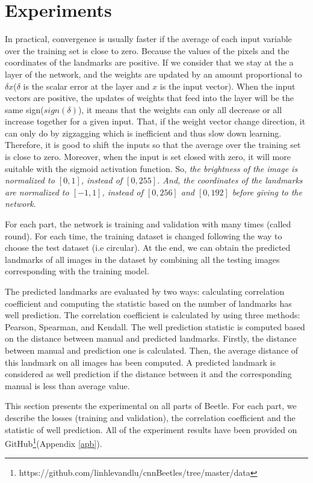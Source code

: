 \documentclass[12pt,a4paper]{article}
\begin{document}
\section{Experiments}
In practical, convergence is usually faster if the average of each input variable over the training set is close to zero. Because the values of the pixels and the coordinates of the landmarks are positive. If we consider that we stay at the a layer of the network, and the weights are updated by an amount proportional to $\delta x$($\delta$ is the scalar error at the layer and $x$ is the input vector). When the input vectors are positive, the updates of weights that feed into the layer will be the same sign($sign(\delta)$), it means that the weights can only all decrease or all increase together for a given input. That, if the weight vector change direction, it can only do by zigzagging which is inefficient and thus slow down learning. Therefore, it is good to shift the inputs so that the average over the training set is close to zero. Moreover, when the input is set closed with zero, it will more suitable with the sigmoid activation function\cite{lecun2012efficient}. So, \textit{the brightness of the image is normalized to $[0,1]$, instead of $[0,255]$. And, the coordinates of the landmarks are normalized to $[-1,1]$, instead of $[0,256]$ and $[0,192]$ before giving to the network}.

For each part, the network is training and validation with many times (called round). For each time, the training dataset is changed following the way to choose the test dataset (i.e circular). At the end, we can obtain the predicted landmarks of all images in the dataset by combining all the  testing images corresponding with the training model. 

The predicted landmarks are evaluated by two ways: calculating correlation coefficient and computing the statistic based on the number of landmarks has well prediction.
The correlation coefficient is calculated by using three methods: Pearson\cite{pallant2013spss}, Spearman\cite{myers2010research}, and Kendall\cite{kendall1938new}. The well prediction statistic is computed based on the distance between manual and predicted landmarks. Firstly, the distance between manual and prediction one is calculated. Then, the average distance of this landmark on all images has been computed. A predicted landmark is considered as well prediction if the distance between it and the corresponding manual is less than average value.

This section presents the experimental on all parts of Beetle. For each part, we describe the losses (training and validation), the correlation coefficient and the statistic of well prediction. All of the experiment results have been provided on GitHub\footnote{https://github.com/linhlevandlu/cnnBeetles/tree/master/data}(Appendix \ref{apb}).
\pagebreak
\end{document}
